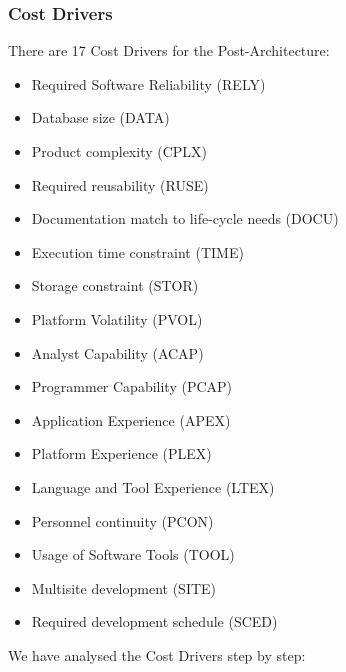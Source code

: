 \documentclass{article}
\begin{document}
\subsubsection{Cost Drivers}
There are 17 Cost Drivers for the Post-Architecture:
\begin{itemize}
	\item Required Software Reliability (RELY)
	\item Database size (DATA)
	\item Product complexity (CPLX)
	\item Required reusability (RUSE)
	\item Documentation match to life-cycle needs (DOCU)
	\item Execution time constraint (TIME)
	\item Storage constraint (STOR)
	\item Platform Volatility (PVOL)
	\item Analyst Capability (ACAP)
	\item Programmer Capability (PCAP)
	\item Application Experience (APEX)
	\item Platform Experience (PLEX)
	\item Language and Tool Experience (LTEX)
	\item Personnel continuity (PCON)
	\item Usage of Software Tools (TOOL)
	\item Multisite development (SITE)
	\item Required development schedule (SCED)
\end{itemize}
\newpage

We have analysed the Cost Drivers step by step:
\end{document}
